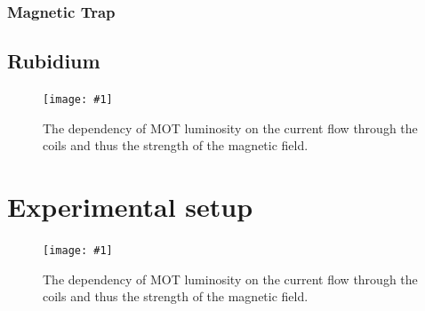 \documentclass[twocolumn]{article}
\newcommand{\insertFigure}[1]{%
   \texttt{[image: \#1]}%
}
\begin{document}
\subsubsection{Magnetic Trap}

\subsection{Rubidium} \label{sec:Rubidium}
\begin{figure} [!h]
	\centering
	\insertFigure{Images/Spectrum.png}
	\caption{The dependency of MOT luminosity on the current flow through the coils and thus the strength of the magnetic field.}
	\label{fig:Spectrum}
\end{figure}

\section{Experimental setup} \label{sec:Exp}
\begin{figure} [!h]
	\centering
	\insertFigure{Images/Laser.png}
	\caption{The dependency of MOT luminosity on the current flow through the coils and thus the strength of the magnetic field.\cite{manual}}
	\label{fig:Laser}
\end{figure}
\end{document}
